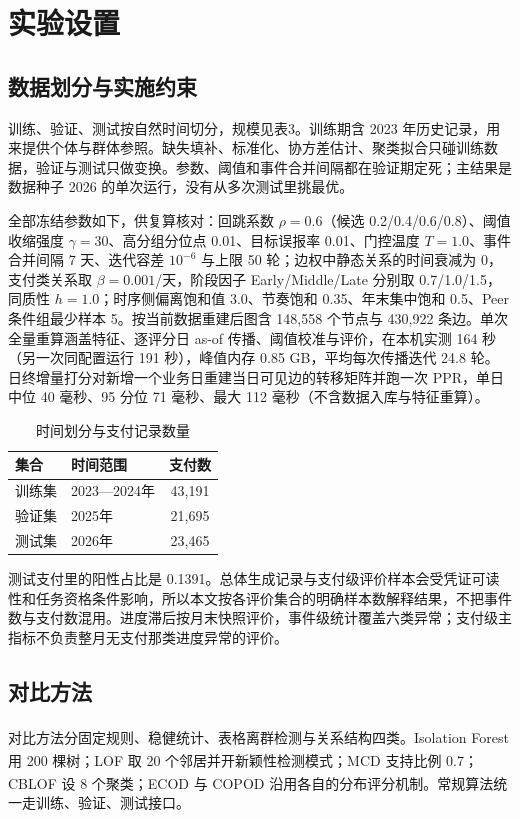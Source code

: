 \documentclass[twocolumn,11pt]{ctexart}
\newcommand{\upcite}[1]{\textsuperscript{\cite{#1}}}
\begin{document}
\section{实验设置}
\subsection{数据划分与实施约束}
训练、验证、测试按自然时间切分，规模见表3。训练期含 2023 年历史记录，用来提供个体与群体参照。缺失填补、标准化、协方差估计、聚类拟合只碰训练数据，验证与测试只做变换。参数、阈值和事件合并间隔都在验证期定死；主结果是数据种子 2026 的单次运行，没有从多次测试里挑最优。

全部冻结参数如下，供复算核对：回跳系数 $\rho=0.6$（候选 0.2/0.4/0.6/0.8）、阈值收缩强度 $\gamma=30$、高分组分位点 0.01、目标误报率 0.01、门控温度 $T=1.0$、事件合并间隔 7 天、迭代容差 $10^{-6}$ 与上限 50 轮；边权中静态关系的时间衰减为 0，支付类关系取 $\beta=0.001$/天，阶段因子 Early/Middle/Late 分别取 0.7/1.0/1.5，同质性 $h=1.0$；时序侧偏离饱和值 3.0、节奏饱和 0.35、年末集中饱和 0.5、Peer 条件组最少样本 5。按当前数据重建后图含 148,558 个节点与 430,922 条边。单次全量重算涵盖特征、逐评分日 as-of 传播、阈值校准与评价，在本机实测 164 秒（另一次同配置运行 191 秒），峰值内存 0.85 GB，平均每次传播迭代 24.8 轮。日终增量打分对新增一个业务日重建当日可见边的转移矩阵并跑一次 PPR，单日中位 40 毫秒、95 分位 71 毫秒、最大 112 毫秒（不含数据入库与特征重算）。

\begin{table}[t]
\centering\small
\caption{时间划分与支付记录数量}
\begin{tabular}{llc}
\toprule
集合 & 时间范围 & 支付数 \\
\midrule
训练集 & 2023—2024年 & 43,191 \\
验证集 & 2025年 & 21,695 \\
测试集 & 2026年 & 23,465 \\
\bottomrule
\end{tabular}
\end{table}

测试支付里的阳性占比是 0.1391。总体生成记录与支付级评价样本会受凭证可读性和任务资格条件影响，所以本文按各评价集合的明确样本数解释结果，不把事件数与支付数混用。进度滞后按月末快照评价，事件级统计覆盖六类异常；支付级主指标不负责整月无支付那类进度异常的评价。

\subsection{对比方法}
对比方法分固定规则、稳健统计、表格离群检测与关系结构四类。Isolation Forest\upcite{ref2} 用 200 棵树；LOF\upcite{ref3} 取 20 个邻居并开新颖性检测模式；MCD\upcite{ref4} 支持比例 0.7；CBLOF\upcite{ref5} 设 8 个聚类；ECOD\upcite{ref13} 与 COPOD\upcite{ref14} 沿用各自的分布评分机制。常规算法统一走训练、验证、测试接口。
\end{document}
